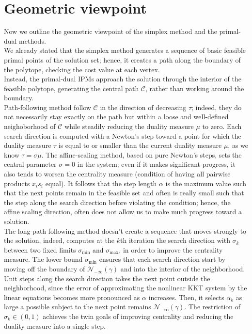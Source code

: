 \documentclass[a4paper,10 pt,titlepage,twoside]{book}
\theoremstyle{plain}
\theoremstyle{definition}
\theoremstyle{remark}
\begin{document}
\section*{Geometric viewpoint}
Now we outline the geometric viewpoint of the simplex method and the primal-dual methods.\\
We already stated that the simplex method generates a sequence of basic feasible primal points of the solution set; hence, it creates a path along the boundary of the polytope, checking the cost value at each vertex.\\Instead, the primal-dual IPMs approach the solution through the interior of the feasible polytope, generating the central path $\mathcal{C}$, rather than working around the boundary.\\ Path-following method follow $\mathcal{C}$ in the direction of decreasing $\tau$; indeed, they do not necessarily stay exactly on the path but within a loose and well-defined neighoborhood of $\mathcal{C}$ while steadily reducing the duality measure $\mu$ to zero. Each search direction is computed with a Newton's step toward a point for which the duality measure $\tau$ is equal to or smaller than the current duality measure $\mu$, as we know $\tau=\sigma\mu$. 
The affine-scaling method, based on pure Newton's steps, sets the central parameter $\sigma= 0$ in the system;
even if it makes significant progress, it also tends to worsen the centrality measure (condition of having all pairwise products $x_{i}s_{i}$ equal). It follows that the step length $\alpha$ is the maximum value such that the next points remain in the feasible set and often is really small
such that the step along the search direction before violating the condition; hence, the affine scaling direction, often does not allow us to make much progress toward a solution.\\ 
The long-path following method doesn't create a sequence that moves strongly to the solution, indeed, computes at the $k$th iteration the search direction with $\sigma_{k}$ between two fixed limits $\sigma_{\text{min}}$ and $\sigma_{\text{max}}$, in order to improve the centrality measure. The lower bound $\sigma_{\text{min}}$ ensures that each search direction start by moving off the boundary of $\mathcal{N}_{-\infty}(\gamma)$ and into the interior of the neighborhood. Unit steps along the search direction takes the next point outside the neighborhood, since the error of approximating the nonlinear KKT system by the linear equations becomes more pronounced as $\alpha$ increases. Then, it selects $\alpha_{k}$ as large a possible subject to the next point remains $\mathcal{N}_{-\infty}(\gamma)$. The restriction of $\sigma_{k}\in(0,1)$ achieves the twin goals of improving centrality and reducing the duality measure into a single step.\\
\end{document}
